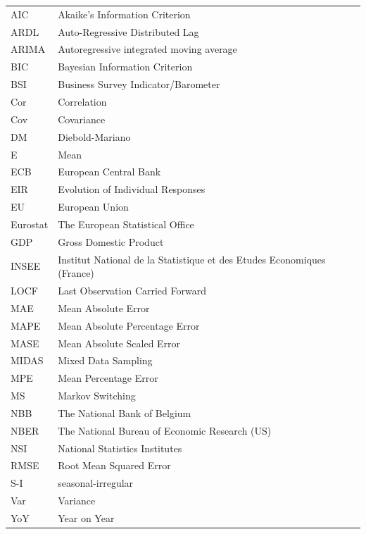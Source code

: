 \documentclass[12pt,a4paper,oneside]{book}
\begin{document}
\begin{tabular}{l l}
  AIC       & Akaike's Information Criterion \\
  ARDL      & Auto-Regressive Distributed Lag \\
  ARIMA     & Autoregressive integrated moving average \\
  BIC		& Bayesian Information Criterion \\
  BSI       & Business Survey Indicator/Barometer \\
  Cor       & Correlation \\
  Cov       & Covariance \\
  DM        & Diebold-Mariano \\
  E         & Mean \\
  ECB       & European Central Bank \\
  EIR       & Evolution of Individual Responses \\
  EU		& European Union \\
  Eurostat  & The European Statistical Office \\
  GDP       & Gross Domestic Product \\
  INSEE     & Institut National de la Statistique et des Etudes Economiques (France) \\
  LOCF 		& Last Observation Carried Forward \\
  MAE 		& Mean Absolute Error \\
  MAPE		& Mean Absolute Percentage Error \\
  MASE 		& Mean Absolute Scaled Error \\
  MIDAS     & Mixed Data Sampling \\
  MPE 		& Mean Percentage Error \\
  MS        & Markov Switching \\
  NBB       & The National Bank of Belgium \\
  NBER      & The National Bureau of Economic Research (US) \\
  NSI       & National Statistics Institutes \\
  RMSE 		& Root Mean Squared Error \\
  S-I       & seasonal-irregular \\
  Var       & Variance \\
  YoY       & Year on Year 
\end{tabular}

\tableofcontents

\newpage
\setcounter{page}{0}
\end{document}
